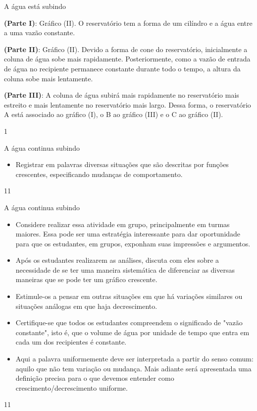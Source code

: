 \begin{answer}{A água está subindo}
{
\textbf{(Parte I)}: Gráfico (II). O reservatório tem a forma de um cilíndro e a água entre a uma vazão constante.

\textbf{(Parte II)}: Gráfico (II). Devido a forma de cone do reservatório, inicialmente a coluna de água sobe mais rapidamente. Posteriormente, como a vazão de entrada de água no recipiente permanece constante durante todo o tempo, a altura da coluna sobe mais lentamente.

\textbf{(Parte III)}: A coluna de água subirá mais rapidamente no reservatório mais estreito e mais lentamente no reservatório mais largo. Dessa forma, o reservatório A está associado ao gráfico (I), o B ao gráfico (III) e o C ao gráfico (II).
}{1}
\end{answer}
\begin{objectives}{A água continua subindo}
{
\begin{itemize}

\item Registrar em palavras diversas situações que são descritas por funções crescentes, especificando mudanças de comportamento. 

\end{itemize}
}{1}{1}
\end{objectives}
\begin{sugestions}{A água continua subindo}
{
\begin{itemize}
\item Considere realizar essa atividade em grupo, principalmente em turmas maiores. Essa pode ser uma estratégia interessante para dar oportunidade para que os estudantes, em grupos, exponham suas impressões e argumentos.
\item Após os estudantes realizarem as análises, discuta com eles sobre a necessidade de se ter uma maneira sistemática de diferenciar as diversas maneiras que se pode ter um gráfico crescente.
\item Estimule-os a pensar em outras situações em que há variações similares ou situações análogas em que haja decrescimento.
\item Certifique-se que todos os estudantes compreendem o significado de "vazão constante", isto é, que o volume de água por unidade de tempo que entra em cada um dos recipientes é constante.
\item Aqui a palavra uniformemente deve ser interpretada a partir do senso comum: aquilo
que não tem variação ou mudança. Mais adiante será apresentada uma definição
precisa para o que devemos entender como crescimento/decrescimento uniforme.
\end{itemize}
}{1}{1}
\end{sugestions}
